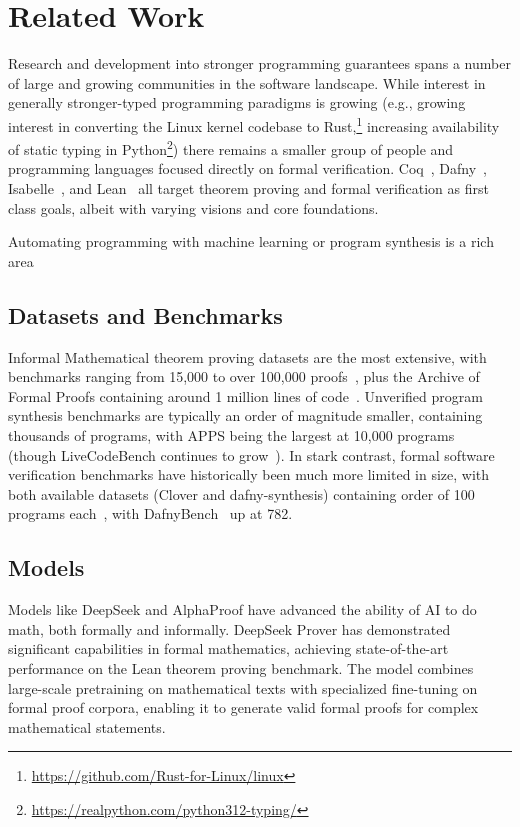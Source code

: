 \section{Related Work}
Research and development into stronger programming guarantees spans a number of large and growing communities in the software landscape.
While interest in generally stronger-typed programming paradigms is growing (e.g., growing interest in converting the Linux kernel codebase to Rust,\footnote{\url{https://github.com/Rust-for-Linux/linux}}
increasing availability of static typing in Python\footnote{\url{https://realpython.com/python312-typing/}}) there remains a smaller group of people and programming languages focused directly on formal verification.
Coq~\cite{coq}, Dafny~\cite{dafnybook}, Isabelle~\cite{isabellebook}, and Lean~\cite{demoura2015lean} all target theorem proving and formal verification as first class goals, albeit with varying visions and core foundations.

Automating programming with machine learning or program synthesis is a rich area~\cite{ellis2020dreamcodergrowinggeneralizableinterpretable, austin2021programsynthesislargelanguage}

\subsection{Datasets and Benchmarks}

Informal Mathematical theorem proving datasets are the most extensive, with benchmarks ranging from 15,000 to over 100,000 proofs~\cite{coqgym,leandojo,jiang2021lisa,naturalproofs}, plus the Archive of Formal Proofs containing around 1 million lines of code~\cite{afp}. Unverified program synthesis benchmarks are typically an order of magnitude smaller, containing thousands of programs, with APPS being the largest at 10,000 programs~\cite{Hendrycks2021MeasuringCC} (though LiveCodeBench continues to grow~\cite{livecodebench}). In stark contrast, formal software verification benchmarks have historically been much more limited in size, with both available datasets (Clover and dafny-synthesis) containing order of 100 programs each~\cite{clover,dafny-synthesis}, with DafnyBench~\cite{loughridge2024dafnybench} up at 782.

\subsection{Models}

Models like DeepSeek \cite{xin2024deepseekproveradvancingtheoremproving,xin2024deepseekproverv15harnessingproofassistant} and AlphaProof \cite{deepmind2024imo} have advanced the ability of AI to do math, both formally and informally. DeepSeek Prover has demonstrated significant capabilities in formal mathematics, achieving state-of-the-art performance on the Lean theorem proving benchmark. The model combines large-scale pretraining on mathematical texts with specialized fine-tuning on formal proof corpora, enabling it to generate valid formal proofs for complex mathematical statements.


